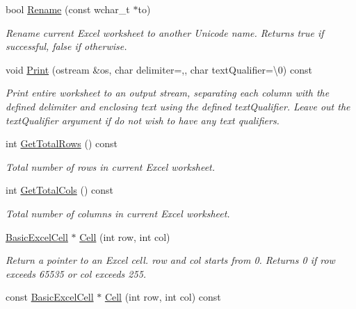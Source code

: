 \begin{DoxyCompactItemize}
bool \hyperlink{class_y_excel_1_1_basic_excel_worksheet_aae84dfe5dc5bc2c52267e4c4ed46714a}{Rename} (const wchar\+\_\+t $\ast$to)
\begin{DoxyCompactList}\small\item\em Rename current Excel worksheet to another Unicode name. Returns true if successful, false if otherwise. \end{DoxyCompactList}\item 
void \hyperlink{class_y_excel_1_1_basic_excel_worksheet_ac6b8ceafcbcf0b8a85962fe13bbb88ee}{Print} (ostream \&os, char delimiter=\textquotesingle{},\textquotesingle{}, char text\+Qualifier=\textquotesingle{}\textbackslash{}0\textquotesingle{}) const 
\begin{DoxyCompactList}\small\item\em Print entire worksheet to an output stream, separating each column with the defined delimiter and enclosing text using the defined text\+Qualifier. Leave out the text\+Qualifier argument if do not wish to have any text qualifiers. \end{DoxyCompactList}\item 
int \hyperlink{class_y_excel_1_1_basic_excel_worksheet_a8dce97605c50fecefe3bed6a85898721}{Get\+Total\+Rows} () const 
\begin{DoxyCompactList}\small\item\em Total number of rows in current Excel worksheet. \end{DoxyCompactList}\item 
int \hyperlink{class_y_excel_1_1_basic_excel_worksheet_a76ba86b19cb3325f8e0d15fd5be03d34}{Get\+Total\+Cols} () const 
\begin{DoxyCompactList}\small\item\em Total number of columns in current Excel worksheet. \end{DoxyCompactList}\item 
\hyperlink{class_y_excel_1_1_basic_excel_cell}{Basic\+Excel\+Cell} $\ast$ \hyperlink{class_y_excel_1_1_basic_excel_worksheet_a4c1470a3aeba7ce561f60f9447c8bcd7}{Cell} (int row, int col)
\begin{DoxyCompactList}\small\item\em Return a pointer to an Excel cell. row and col starts from 0. Returns 0 if row exceeds 65535 or col exceeds 255. \end{DoxyCompactList}\item 
const \hyperlink{class_y_excel_1_1_basic_excel_cell}{Basic\+Excel\+Cell} $\ast$ \hyperlink{class_y_excel_1_1_basic_excel_worksheet_a589b099ce0fb38229da16a3deeb7c182}{Cell} (int row, int col) const 

\end{DoxyCompactItemize}
